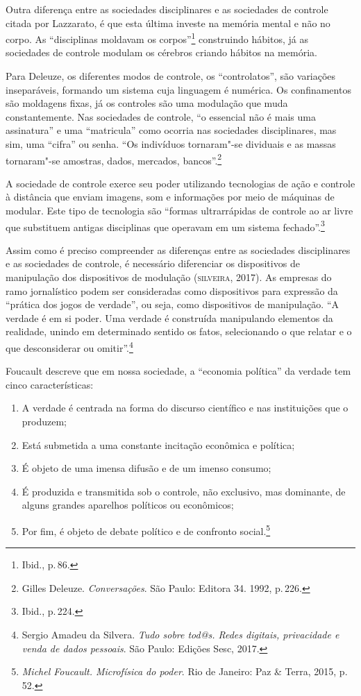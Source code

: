 Outra diferença entre as sociedades disciplinares e as sociedades de
controle citada por Lazzarato, é que esta última investe na
memória mental e não no corpo. As ``disciplinas moldavam os corpos''\footnote{Ibid., p.\,86.} construindo hábitos, já as sociedades de controle modulam os
cérebros criando hábitos na memória.

Para Deleuze, os diferentes modos de controle, os
``controlatos'', são variações inseparáveis, formando um sistema cuja
linguagem é numérica. Os confinamentos são moldagens fixas, já os
controles são uma modulação que muda constantemente. Nas sociedades de
controle, ``o essencial não é mais uma assinatura'' e uma ``matricula''
como ocorria nas sociedades disciplinares, mas sim, uma ``cifra'' ou
senha. ``Os indivíduos tornaram"-se dividuais e as massas tornaram"-se
amostras, dados, mercados, bancos''.\footnote{Gilles Deleuze. \emph{Conversações}. São Paulo: Editora 34. 1992, p.\,226.}

A sociedade de controle exerce seu poder utilizando tecnologias de ação
e controle à distância que enviam imagens, som e informações por meio de
máquinas de modular. Este tipo de tecnologia são ``formas ultrarrápidas
de controle ao ar livre que substituem antigas disciplinas que operavam
em um sistema fechado''.\footnote{Ibid., p.\,224.}

Assim como é preciso compreender as diferenças entre as sociedades
disciplinares e as sociedades de controle, é necessário diferenciar os
dispositivos de manipulação dos dispositivos de modulação (\textsc{silveira},
2017). As empresas do ramo jornalístico podem ser consideradas como
dispositivos para expressão da ``prática dos jogos de verdade'', ou
seja, como dispositivos de manipulação. ``A verdade é em si poder. Uma
verdade é construída manipulando elementos da realidade, unindo em
determinado sentido os fatos, selecionando o que relatar e o que
desconsiderar ou omitir''.\footnote{Sergio Amadeu da Silvera. \emph{Tudo sobre tod@s. Redes digitais, privacidade e venda de dados pessoais}. São Paulo: Edições Sesc, 2017.}

Foucault descreve que em nossa sociedade, a ``economia política''
da verdade tem cinco características: 

\begin{enumerate}
\item A verdade é centrada na forma
do discurso científico e nas instituições que o produzem; 

\item Está submetida a uma constante incitação econômica e política;

\item É objeto de uma imensa difusão e de um imenso consumo; 

\item É produzida e transmitida sob o controle, não exclusivo, mas dominante, de alguns grandes aparelhos políticos ou econômicos; 

\item Por fim, é objeto de debate político e de confronto social.\footnote{\emph{Michel Foucault. Microfísica do poder}. Rio de Janeiro: Paz \& Terra, 2015, p.\,52.}
\end{enumerate}


